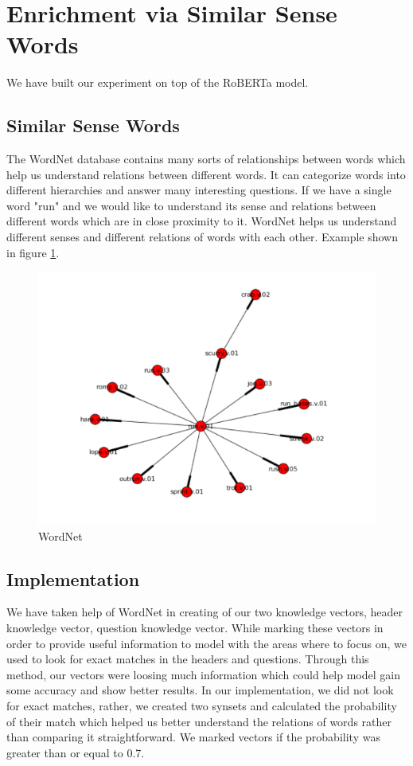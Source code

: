 \documentclass[12pt]{article}
\begin{document}
\section{Enrichment via Similar Sense Words}
We have built our experiment on top of the RoBERTa model. 

\subsection{Similar Sense Words}
The WordNet database contains many sorts of relationships between words which help us understand relations between different words. It can categorize words into different hierarchies and answer many interesting questions. If we have a single word "run" and we would like to understand its sense and relations between different words which are in close proximity to it. WordNet helps us understand different senses and different relations of words with each other. Example shown in figure \ref{wordnet}.


\begin{figure}[H]
    \includegraphics[width=400pt]{wordnet}
    \caption{WordNet}
    \label{wordnet}
\end{figure}

\subsection{Implementation}
We have taken help of WordNet in creating of our two knowledge vectors, header knowledge vector, question knowledge vector. While marking these vectors in order to provide useful information to model with the areas where to focus on, we used to look for exact matches in the headers and questions. Through this method, our vectors were loosing much information which could help model gain some accuracy and show better results. In our implementation, we did not look for exact matches, rather, we created two synsets and calculated the probability of their match which helped us better understand the relations of words rather than comparing it straightforward. We marked vectors if the probability was greater than or equal to 0.7. 
\end{document}
